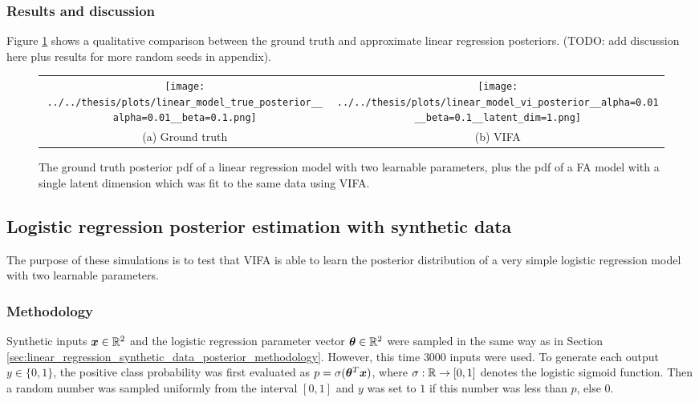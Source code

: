 \documentclass[10pt]{article} %
\begin{document}
\subsubsection{Results and discussion}

Figure \ref{fig:linear_regression_synthetic_data_posterior} shows a qualitative comparison between the ground truth and approximate linear regression posteriors. (TODO: add discussion here plus results for more random seeds in appendix).
\begin{figure}[!htbp] 
\begin{center}
\begin{tabular}{cc}
	\texttt{[image: ../../thesis/plots/linear\_model\_true\_posterior\_\_alpha=0.01\_\_beta=0.1.png]}
	& \texttt{[image: ../../thesis/plots/linear\_model\_vi\_posterior\_\_alpha=0.01\_\_beta=0.1\_\_latent\_dim=1.png]} \\
	(a) Ground truth
	& (b) VIFA \\[6pt]
\end{tabular}
\end{center}
\caption{The ground truth posterior pdf of a linear regression model with two learnable parameters, plus the pdf of a FA model with a single latent dimension which was fit to the same data using VIFA.}
\label{fig:linear_regression_synthetic_data_posterior}
\end{figure}


\subsection{Logistic regression posterior estimation with synthetic data}

The purpose of these simulations is to test that VIFA is able to learn the posterior distribution of a very simple logistic regression model with two learnable parameters.

\subsubsection{Methodology}

Synthetic inputs ${\bm{x}} \in \mathbb{R}^2$ and the logistic regression parameter vector ${\bm{\theta}} \in \mathbb{R}^2$ were sampled in the same way as in Section \ref{sec:linear_regression_synthetic_data_posterior_methodology}. However, this time $3000$ inputs were used. To generate each output $y \in \{0, 1\}$, the positive class probability was first evaluated as $p = \sigma({\bm{\theta}}^T {\bm{x}})$, where $\sigma: \mathbb{R} \rightarrow [0,1]$ denotes the logistic sigmoid function. Then a random number was sampled uniformly from the interval $[0, 1]$ and $y$ was set to $1$ if this number was less than $p$, else $0$.
\end{document}
